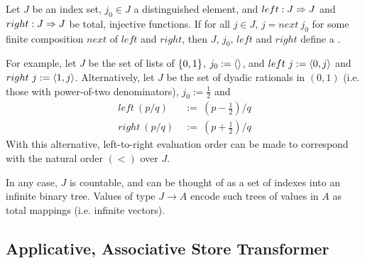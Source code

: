 \begin{definition}
Let $J$ be an index set, $j_0 \in J$ a distinguished element, and $left : J \Rightarrow J$ and $right : J \Rightarrow J$ be total, injective functions. If for all $j \in J$, $j = next~j_0$ for some finite composition $next$ of $left$ and $right$, then $J$, $j_0$, $left$ and $right$ define a .
\end{definition}

For example, let $J$ be the set of lists of $\{{0,1}\}$, $j_0 := \langle{}\rangle$, and $left~j := \langle{0,j}\rangle$ and $right~j := \langle{1,j}\rangle$.
Alternatively, let $J$ be the set of dyadic rationals in $(0,1)$ (i.e. those with power-of-two denominators), $j_0 := \tfrac{1}{2}$ and
\begin{equation}
\begin{aligned}
	left~(p/q) &\ := \ (p-\tfrac{1}{2})/q
\\
	right~(p/q) &\ := \ (p+\tfrac{1}{2})/q
\end{aligned}
\end{equation}
With this alternative, left-to-right evaluation order can be made to correspond with the natural order $(<)$ over $J$.

In any case, $J$ is countable, and can be thought of as a set of indexes into an infinite binary tree.
Values of type $J \to A$ encode such trees of values in $A$ as total mappings (i.e. infinite vectors).

\subsection{Applicative, Associative Store Transformer}

